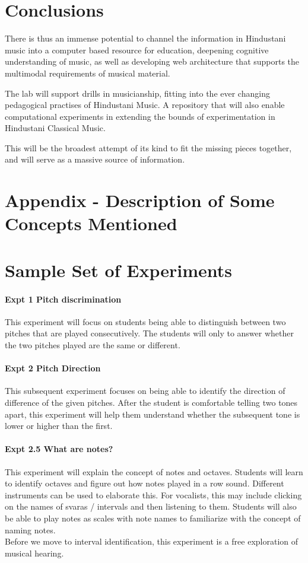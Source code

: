 \documentclass{tufte-handout}
\begin{document}
\section{Conclusions}
There is thus an immense potential to channel the information in Hindustani music into a computer based resource for education, deepening cognitive understanding of music, as well as developing web architecture that supports the multimodal requirements of musical material.

The lab will support drills in musicianship, fitting into the ever changing pedagogical practises of Hindustani Music. A repository that will also enable computational experiments in extending the bounds of experimentation in Hindustani Classical Music. 

This will be the broadest attempt of its kind to fit the missing pieces together, and will serve as a massive source of information.




\section{Appendix - Description of Some Concepts Mentioned}

\section{Sample Set of Experiments}
\paragraph{Expt 1 Pitch discrimination}
This experiment will focus on students being able to distinguish
between two pitches that are played consecutively. The students will
only to answer whether the two pitches played are the same or
different.
\paragraph{Expt 2 Pitch Direction}

This subsequent experiment focuses on being able to identify the
direction of difference of the given pitches. After the student is
comfortable telling two tones apart, this experiment will help them
understand whether the subsequent tone is lower or higher than the
first.
\paragraph{Expt 2.5 What are notes?}
This experiment will explain the concept of notes and
octaves. Students will learn to identify octaves and figure out how
notes played in a row sound. Different instruments can be used to
elaborate this. For vocalists, this may include clicking on the names
of svaras / intervals and then listening to them. Students will also
be able to play notes as scales with note names to familiarize with
the concept of naming notes.\\
Before we move to interval identification, this experiment is a free
exploration of musical hearing.
\end{document}
